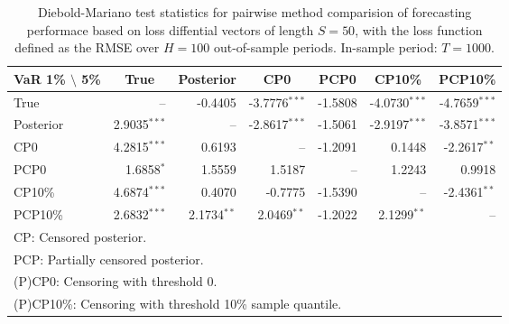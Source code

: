 { \renewcommand{\arraystretch}{1.2} 
\begin{table} 
\center 
\begin{tabular}{l | rrr rrr} 
VaR 1\% $\setminus$ 5\% & \multicolumn{1}{c}{True} & \multicolumn{1}{c}{Posterior} & \multicolumn{1}{c}{CP0} & \multicolumn{1}{c}{PCP0} & \multicolumn{1}{c}{CP10\%} & \multicolumn{1}{c}{PCP10\%} \\ \hline 
True &    --\phantom{$^{***}$} & -0.4405\phantom{$^{***}$} & -3.7776$^{***}$ & -1.5808\phantom{$^{***}$} & -4.0730$^{***}$ & -4.7659$^{***}$  \\ 
Posterior & 2.9035$^{***}$ &    --\phantom{$^{***}$} & -2.8617$^{***}$ & -1.5061\phantom{$^{***}$} & -2.9197$^{***}$ & -3.8571$^{***}$  \\ 
CP0 & 4.2815$^{***}$ & 0.6193\phantom{$^{***}$} &    --\phantom{$^{***}$} & -1.2091\phantom{$^{***}$} & 0.1448\phantom{$^{***}$} & -2.2617$^{**}$\phantom{$^{*}$}  \\ 
PCP0 & 1.6858$^{*}$\phantom{$^{**}$} & 1.5559\phantom{$^{***}$} & 1.5187\phantom{$^{***}$} &    --\phantom{$^{***}$} & 1.2243\phantom{$^{***}$} & 0.9918\phantom{$^{***}$}  \\ 
CP10\% & 4.6874$^{***}$ & 0.4070\phantom{$^{***}$} & -0.7775\phantom{$^{***}$} & -1.5390\phantom{$^{***}$} &    --\phantom{$^{***}$} & -2.4361$^{**}$\phantom{$^{*}$}  \\ 
PCP10\% & 2.6832$^{***}$ & 2.1734$^{**}$\phantom{$^{*}$} & 2.0469$^{**}$\phantom{$^{*}$} & -1.2022\phantom{$^{***}$} & 2.1299$^{**}$\phantom{$^{*}$} &    --\phantom{$^{***}$}  \\ 
\hline 
\multicolumn{7}{l}{\footnotesize{CP: Censored posterior.}}  \\ 
\multicolumn{7}{l}{\footnotesize{PCP: Partially censored posterior.}} \\ 
\multicolumn{7}{l}{\footnotesize{(P)CP0: Censoring with threshold 0.}} \\ 
\multicolumn{7}{l}{\footnotesize{(P)CP10\%: Censoring with threshold 10\% sample quantile.}}  \\ 
\end{tabular}
 \caption{Diebold-Mariano test statistics for  pairwise method comparision of forecasting performace based on loss diffential vectors of length $S = 50$, with the loss function defined as the RMSE over $H=100$ out-of-sample periods. In-sample period: $T = 1000$.} 
\label{tab:garch11_DM_T_1000}  
\end{table}
}